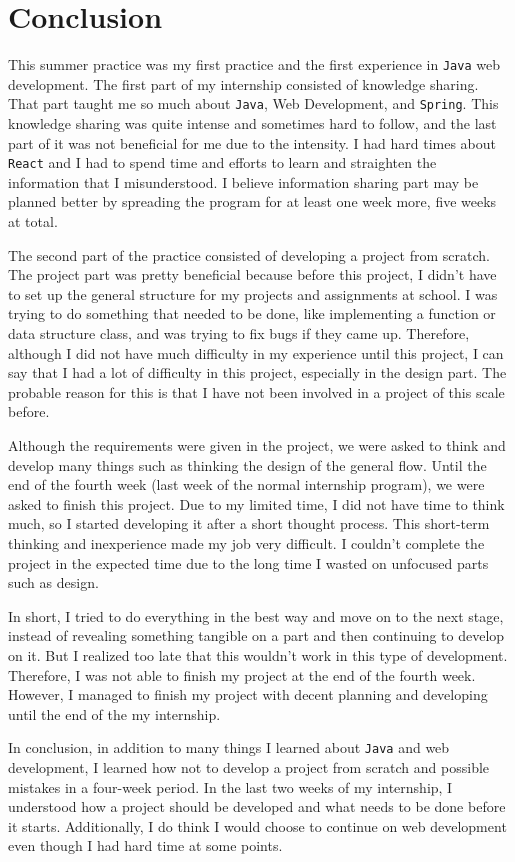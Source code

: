\section{Conclusion}

This summer practice was my first practice and the first experience in \texttt{Java} web development. The first part of my internship consisted of knowledge sharing. That part taught me so much about \texttt{Java}, Web Development, and \texttt{Spring}. This knowledge sharing was quite intense and sometimes hard to follow, and the last part of it was not beneficial for me due to the intensity. I had hard times about \texttt{React} and I had to spend time and efforts to learn and straighten the information that I misunderstood. I believe information sharing part may be planned better by spreading the program for at least one week more, five weeks at total.

The second part of the practice consisted of developing a project from scratch. The project part was pretty beneficial because before this project, I didn't have to set up the general structure for my projects and assignments at school. I was trying to do something that needed to be done, like implementing a function or data structure class, and was trying to fix bugs if they came up. Therefore, although I did not have much difficulty in my experience until this project, I can say that I had a lot of difficulty in this project, especially in the design part. The probable reason for this is that I have not been involved in a project of this scale before.

Although the requirements were given in the project, we were asked to think and develop many things such as thinking the design of the general flow. Until the end of the fourth week (last week of the normal internship program), we were asked to finish this project. Due to my limited time, I did not have time to think much, so I started developing it after a short thought process. This short-term thinking and inexperience made my job very difficult. I couldn't complete the project in the expected time due to the long time I wasted on unfocused parts such as design.

In short, I tried to do everything in the best way and move on to the next stage, instead of revealing something tangible on a part and then continuing to develop on it. But I realized too late that this wouldn't work in this type of development. Therefore, I was not able to finish my project at the end of the fourth week. However, I managed to finish my project with decent planning and developing until the end of the my internship.

In conclusion, in addition to many things I learned about \texttt{Java} and web development, I learned how not to develop a project from scratch and possible mistakes in a four-week period. In the last two weeks of my internship, I understood how a project should be developed and what needs to be done before it starts. Additionally, I do think I would choose to continue on web development even though I had hard time at some points.
